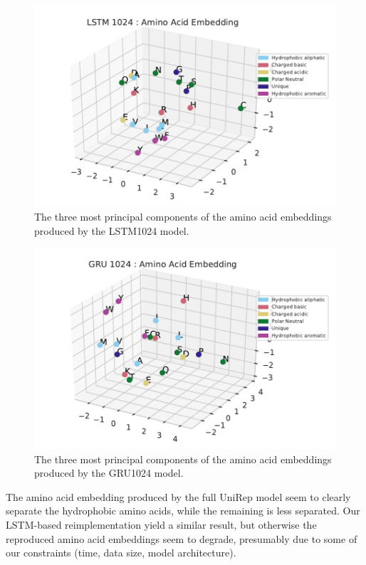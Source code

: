 \documentclass[a4paper,12pt]{article}
\begin{document}
\begin{figure}[H]
    \centering
    \includegraphics[width=\linewidth]{figures/fig2a_LSTM_1024_no_trunc.pdf}
    \caption{The three most principal components of the amino acid embeddings produced by the LSTM1024 model.}
    \label{fig:fig2a_LSTM}
\end{figure}

\begin{figure}[H]
    \centering
    \includegraphics[width=\linewidth]{figures/fig2a_GRU_1024_no_trunc.pdf}
    \caption{The three most principal components of the amino acid embeddings produced by the GRU1024 model.}
    \label{fig:fig2a_GRU}
\end{figure}

The amino acid embedding produced by the full UniRep model seem to clearly separate the hydrophobic amino acids, while the remaining is less separated. Our LSTM-based reimplementation yield a similar result, but otherwise the reproduced amino acid embeddings seem to degrade, presumably due to some of our constraints (time, data size, model architecture). 
\end{document}
